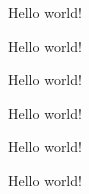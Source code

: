 \documentclass{article}
\begin{document}
\newcommand{\myfontsize}{10}
\fontsize{\myfontsize}{1.2\myfontsize}\selectfont
Hello world!

\renewcommand{\myfontsize}{20}
\fontsize{\myfontsize}{1.2\myfontsize}\selectfont

Hello world!

\renewcommand{\myfontsize}{30}
\fontsize{\myfontsize}{1.2\myfontsize}\selectfont

Hello world!

\renewcommand{\myfontsize}{40}
\fontsize{\myfontsize}{1.2\myfontsize}\selectfont

Hello world!

\renewcommand{\myfontsize}{50}
\fontsize{\myfontsize}{1.2\myfontsize}\selectfont

Hello world!

\renewcommand{\myfontsize}{60}
\fontsize{\myfontsize}{1.2\myfontsize}\selectfont

Hello world!
\end{document}
